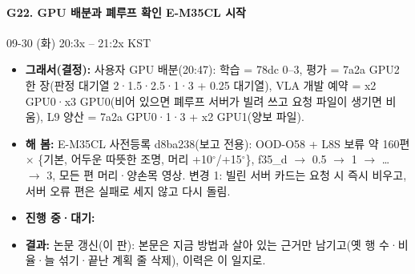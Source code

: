 \paragraph{G22. GPU 배분과 폐루프 확인 E-M35CL 시작}
{\small 09-30 (화) 20:3x -- 21:2x KST}
\begin{itemize}
  \item \textbf{그래서(결정):} 사용자 GPU 배분(20:47): 학습 = 78dc 0--3, 평가 = 7a2a GPU2 한 장(판정 대기열 2·1.5·2.5·1·3 + 0.25 대기열), VLA 개발 예약 = x2 GPU0·x3 GPU0(비어 있으면 폐루프 서버가 빌려 쓰고 요청 파일이 생기면 비움), L9 양산 = 7a2a GPU0·1·3 + x2 GPU1(양보 파일).
  \item \textbf{해 봄:} E-M35CL 사전등록 d8ba238(보고 전용): OOD-O58 + L8S 보류 약 160편 $\times$ \{기본, 어두운 따뜻한 조명, 머리 +10$^\circ$/+15$^\circ$\}, f35\_d $\rightarrow$ 0.5 $\rightarrow$ 1 $\rightarrow$ \ldots{} $\rightarrow$ 3, 모든 편 머리·양손목 영상. 변경 1: 빌린 서버 카드는 요청 시 즉시 비우고, 서버 오류 편은 실패로 세지 않고 다시 돌림.
  \item \textbf{진행 중·대기:} 
  \item \textbf{결과:} 논문 갱신(이 판): 본문은 지금 방법과 살아 있는 근거만 남기고(옛 행 수·비율·늘 섞기·끝난 계획 줄 삭제), 이력은 이 일지로.
\end{itemize}

